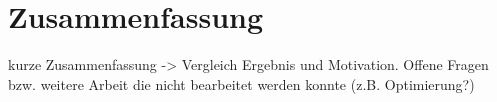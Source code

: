 \chapter{Zusammenfassung}
kurze Zusammenfassung -> Vergleich Ergebnis und Motivation. Offene Fragen bzw. weitere Arbeit die nicht bearbeitet werden konnte (z.B. Optimierung?)
